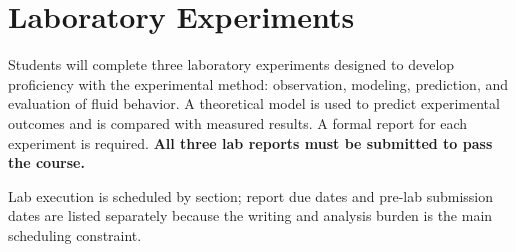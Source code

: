 \section*{Laboratory Experiments}
Students will complete three laboratory experiments designed to develop proficiency with the experimental method: observation, modeling, prediction, and evaluation of fluid behavior. A theoretical model is used to predict experimental outcomes and is compared with measured results. A formal report for each experiment is required. \textbf{All three lab reports must be submitted to pass the course.}

Lab execution is scheduled by section; report due dates and pre-lab submission dates are listed separately because the writing and analysis burden is the main scheduling constraint.

{\small}

